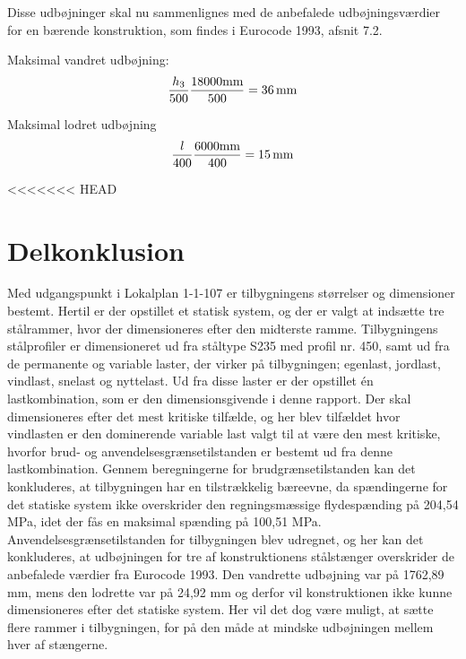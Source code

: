 Disse udbøjninger skal nu sammenlignes med de anbefalede udbøjningsværdier for en bærende konstruktion, som findes i Eurocode 1993, afsnit 7.2. 

Maksimal vandret udbøjning: 
\begin{equation}
\frac{h_3}{500}
\\
\frac{18000 \text{mm}}{500} = \SI{36}{mm}
\end{equation}

Maksimal lodret udbøjning
\begin{equation}
\frac{l}{400}
\\
\frac{6000 \text{mm}}{400} = \SI{15}{mm}
\end{equation}

<<<<<<< HEAD
\section{Delkonklusion}
Med udgangspunkt i Lokalplan 1-1-107 er tilbygningens størrelser og dimensioner bestemt. Hertil er der opstillet et statisk system, og der er valgt at indsætte tre stålrammer, hvor der  dimensioneres efter den midterste ramme.
\newline \indent{     }  Tilbygningens stålprofiler er dimensioneret ud fra ståltype S235 med profil nr. 450, samt ud fra de permanente og variable laster, der virker på tilbygningen; egenlast, jordlast, vindlast, snelast og nyttelast. Ud fra disse laster er der opstillet én lastkombination, som er den dimensionsgivende i denne rapport. Der skal dimensioneres efter det mest kritiske tilfælde, og her blev tilfældet hvor vindlasten er den dominerende variable last valgt til at være den mest kritiske, hvorfor brud- og anvendelsesgrænsetilstanden er bestemt ud fra denne lastkombination. 
\newline \indent{     }  Gennem beregningerne for brudgrænsetilstanden kan det konkluderes, at tilbygningen har en tilstrækkelig bæreevne, da spændingerne for det statiske system ikke overskrider den regningsmæssige flydespænding på 204,54 MPa, idet der fås en maksimal spænding på 100,51 MPa.
\newline \indent{     }  Anvendelsesgrænsetilstanden for tilbygningen blev udregnet, og her kan det konkluderes, at udbøjningen for tre af konstruktionens stålstænger overskrider de anbefalede værdier fra Eurocode 1993. Den vandrette udbøjning var på 1762,89 mm, mens den lodrette var på 24,92 mm og derfor vil konstruktionen ikke kunne dimensioneres efter det statiske system. Her vil det dog være muligt, at sætte flere rammer i tilbygningen, for på den måde at mindske udbøjningen mellem hver af stængerne.
